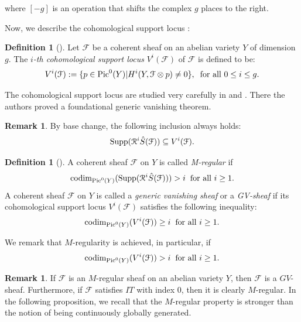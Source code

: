 \documentclass[sn-mathphys-num]{sn-jnl}%
\theoremstyle{definition}
\newtheorem{defn}[theorem]{Definition}
\newtheorem{remark}[theorem]{Remark}
\numberwithin{equation}{section}
\begin{document}
where $[-g]$ is  an operation that shifts the complex $g$ places
to the right.
\par Now,  we describe the cohomological support locus \cite{Greenlazarsfeld}: 
\begin{defn}[{\cite[Page 389]{Greenlazarsfeld}}]
Let $\mathcal{F}$ be a coherent sheaf on an abelian variety $Y$ of dimension $g$. The \emph{$i$-th cohomological support locus} $V^{i}(\mathcal{F})$ of $\mathcal{F}$ is defined to be:
    \[
    V^{i}(\mathcal{F}) := \{p \in \operatorname{Pic}^{0}(Y)| H^{i}(Y, \mathcal{F} \otimes p) \neq 0\}, \hspace{0.2cm} \text{for all }   0\leq i \leq g .\]
\end{defn}
  \par The cohomological support locus are studied very carefully in   \cite{Greenlazarsfeld} and \cite{simpson}. There  the authors proved a foundational generic vanishing theorem. 
\begin{remark}
    By base change, the following inclusion always holds: $$\operatorname{Supp}(\mathcal{R}^{i}\Hat{S}(\mathcal{F})) \subseteq V^{i}(\mathcal{F}).$$
    \end{remark}
    \begin{defn}[{\cite[Definition 3.1]{popasurvey}}] A coherent sheaf $\mathcal{F}$ on $Y$ is called \emph{M-regular} if 
 \[
\text{codim}_{\operatorname{Pic}^{0}(Y)}\text{(Supp}(\mathcal{R}^{i}\Hat{S}(\mathcal{F}))) > i \hspace{0.2cm} \text{for all }  i \geq 1.
\]
A coherent sheaf $\mathcal{F}$ on $Y$ is called a \emph{generic vanishing sheaf} or a \emph{GV-sheaf} if its cohomological support locus $V^{i}(\mathcal{F})$ satisfies the following inequality: 
 \[
    \text{codim}_{\operatorname{Pic}^{0}(Y)}(V^{i}(\mathcal{F})) \geq i \hspace{0.2cm} \text{for all }  i \geq 1.
    \]
    \par We remark that $M$-regularity is achieved, in particular, if
    \[
    \text{codim}_{\operatorname{Pic}^{0}(Y)}(V^{i}(\mathcal{F})) > i \hspace{0.2cm} \text{for all } i \geq 1.
    \]
\end{defn}
\begin{remark}\label{remarkproperties}
If $\mathcal{F}$ is an $M$-regular sheaf on an abelian variety $Y$, then $\mathcal{F}$ is a $GV$-sheaf. Furthermore, if $\mathcal{F}$ satisfies $IT$  with index $0$, then it is clearly  $M$-regular. In the following proposition,  we recall that the $M$-regular property is stronger than the notion of being continuously globally generated.
\end{remark}
\end{document}
